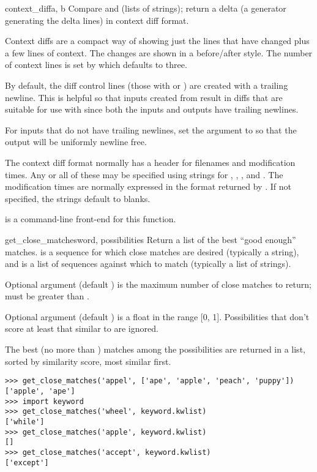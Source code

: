 \begin{funcdesc}{context_diff}{a, b}
  Compare  and  (lists of strings); return a
  delta (a generator generating the delta lines) in context diff
  format.
  
  Context diffs are a compact way of showing just the lines that have
  changed plus a few lines of context.  The changes are shown in a
  before/after style.  The number of context lines is set by 
  which defaults to three.

  By default, the diff control lines (those with \code{***} or \code{---})
  are created with a trailing newline.  This is helpful so that inputs created
  from  result in diffs that are suitable for use
  with  since both the inputs and outputs have
  trailing newlines.

  For inputs that do not have trailing newlines, set the 
  argument to  so that the output will be uniformly newline free.

  The context diff format normally has a header for filenames and
  modification times.  Any or all of these may be specified using strings for
  , , , and .
  The modification times are normally expressed in the format returned by
  .  If not specified, the strings default to blanks.

   is a command-line front-end for this
  function.

\end{funcdesc}  

\begin{funcdesc}{get_close_matches}{word, possibilities}
  Return a list of the best ``good enough'' matches.   is a
  sequence for which close matches are desired (typically a string),
  and  is a list of sequences against which to
  match  (typically a list of strings).

  Optional argument  (default ) is the maximum number
  of close matches to return;  must be greater than .

  Optional argument  (default ) is a float in
  the range [0, 1].  Possibilities that don't score at least that
  similar to  are ignored.

  The best (no more than ) matches among the possibilities are
  returned in a list, sorted by similarity score, most similar first.

\begin{verbatim}
>>> get_close_matches('appel', ['ape', 'apple', 'peach', 'puppy'])
['apple', 'ape']
>>> import keyword
>>> get_close_matches('wheel', keyword.kwlist)
['while']
>>> get_close_matches('apple', keyword.kwlist)
[]
>>> get_close_matches('accept', keyword.kwlist)
['except']
\end{verbatim}
\end{funcdesc}

